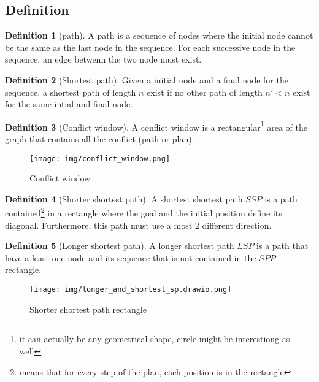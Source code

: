 \documentclass{article}
\theoremstyle{definition}
\newtheorem{definition}{Definition}[section]
\newcommand\widthimg{11cm}
\begin{document}
\subsection{Definition}

\begin{definition}[path]
  A path is a sequence of nodes where the initial node cannot be the same as the last node in the sequence. For each successive node in the sequence, an edge betwenn the two node must exist.
\end{definition}

\begin{definition}[Shortest path]
  Given a initial node and a final node for the sequence, a shortest path of length $n$ exist if no other path of length $n'<n$ exist for the same intial and final node. 
\end{definition}

\begin{definition}[Conflict window]
  A conflict window\cite{vebi21a} is a rectangular\footnote{it can actually be any geometrical shape, circle might be interestiong as well} area of the graph that contains all the conflict (path or plan).  
\end{definition}

\begin{figure}[H]\label{img:conflict_window}
  \centering
  \caption{Conflict window}
  \texttt{[image: img/conflict\_window.png]}
\end{figure}



\begin{definition}[Shorter shortest path]
  A shortest shortest path $SSP$ is a path contained\footnote{means that for every step of the plan, each position is in the rectangle} in a rectangle where the goal and the initial position define its diagonal. Furthermore, this path must use a most 2 different direction. 
\end{definition}

\begin{definition}[Longer shortest path]
  A longer shortest path $LSP$ is a path that have a least one node and its sequence that is not contained in the $SPP$ rectangle. 
\end{definition}

\begin{figure}[H]\label{img:spp_rectangle}
  \centering
  \caption{Shorter shortest path rectangle}
  \texttt{[image: img/longer\_and\_shortest\_sp.drawio.png]}
\end{figure}
  
\end{document}
